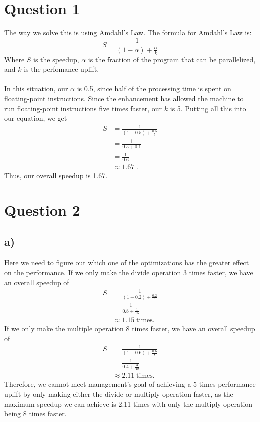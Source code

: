 \documentclass{article}
\begin{document}
\section*{Question 1}
The way we solve this is using Amdahl's Law.
The formula for Amdahl's Law is: 
$$ S = \frac{1}{(1 - \alpha) + \frac{\alpha}{k}} $$
Where $S$ is the speedup, $\alpha$ is the fraction of the program that can be parallelized, and $k$ is the perfomance uplift.
\\ \\
In this situation, our $\alpha$ is 0.5, since half of the processing time is spent on floating-point instructions.
Since the enhancement has allowed the machine to run floating-point instructions five times faster, our $k$ is 5.
Putting all this into our equation, we get
\begin{align*}
S &= \frac{1}{(1 - 0.5) + \frac{0.5}{5}} \\
&= \frac{1}{0.5 + 0.1} \\
&= \frac{1}{0.6} \\
&\approx 1.67 \; .
\end{align*}
Thus, our overall speedup is 1.67.

\section*{Question 2}

\subsection*{a)}
Here we need to figure out which one of the optimizations has the greater effect on the performance.
If we only make the divide operation 3 times faster, we have an overall speedup of
\begin{align*}
    S &= \frac{1}{(1 - 0.2) + \frac{0.2}{3}} \\
    &= \frac{1}{0.8 + \frac{1}{15}} \\
    &\approx 1.15 \; \text{times.}
\end{align*}
If we only make the multiple operation 8 times faster, we have an overall speedup of
\begin{align*}
    S &= \frac{1}{(1 - 0.6) + \frac{0.6}{8}} \\
    &= \frac{1}{0.4 + \frac{3}{40}} \\
    &\approx 2.11 \; \text{times.}
\end{align*}
Therefore, we cannot meet management's goal of achieving a 5 times performance uplift by only making either the divide or multiply operation faster, 
as the maximum speedup we can achieve is 2.11 times with only the multiply operation being 8 times faster.
\end{document}
